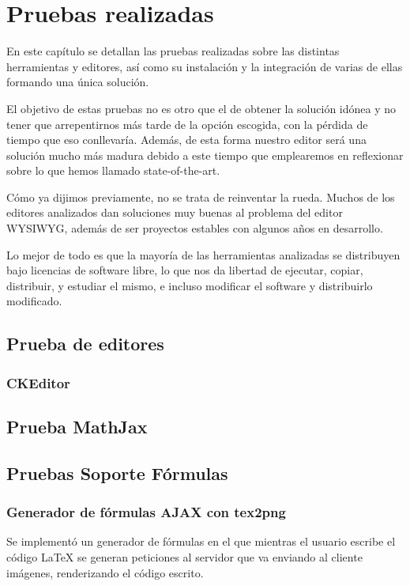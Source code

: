 \chapter{Pruebas realizadas}

En este capítulo se detallan las pruebas realizadas sobre las distintas herramientas y editores, así como su instalación y la integración de varias de ellas formando una única solución.

El objetivo de estas pruebas no es otro que el de obtener la solución idónea y no tener que arrepentirnos más tarde de la opción escogida, con la pérdida de tiempo que eso conllevaría. Además, de esta forma nuestro editor será una solución mucho más madura debido a este tiempo que emplearemos en reflexionar sobre lo que hemos llamado state-of-the-art.

Cómo ya dijimos previamente, no se trata de reinventar la rueda. Muchos de los editores analizados dan soluciones muy buenas al problema del editor WYSIWYG, además de ser proyectos estables con algunos años en desarrollo. 

Lo mejor de todo es que la mayoría de las herramientas analizadas se distribuyen bajo licencias de software libre, lo que nos da libertad de ejecutar, copiar, distribuir, y estudiar el mismo, e incluso modificar el software y distribuirlo modificado. 

\section{Prueba de editores}
\subsection{CKEditor}
\section{Prueba MathJax}
\section{Pruebas Soporte Fórmulas}
\subsection{Generador de fórmulas AJAX con tex2png}
Se implementó un generador de fórmulas en el que mientras el usuario escribe el código {\LaTeX} se generan peticiones al servidor que va enviando al cliente imágenes, renderizando el código escrito. 

